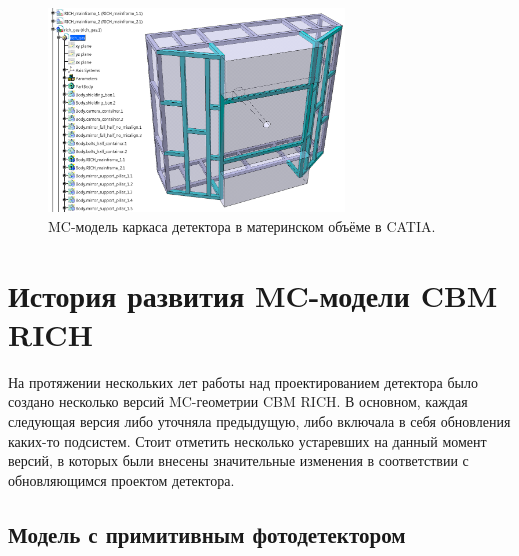 \begin{figure}[H]
\centering
\includegraphics[width=0.7\textwidth]{pictures/Mainframe.png}
\caption{MC-модель каркаса детектора в материнском объёме в CATIA.}
\label{fig:geoMainframe}
\end{figure}

%                                                                          

\section{История развития MC-модели CBM RICH}\label{sec:secRICHgeoHistory}

На протяжении нескольких лет работы над проектированием детектора было создано несколько версий MC-геометрии CBM RICH. В основном, каждая следующая версия либо уточняла предыдущую, либо включала в себя обновления каких-то подсистем. Стоит отметить несколько устаревших на данный момент версий, в которых были внесены значительные изменения в соответствии с обновляющимся проектом детектора.

\subsection{Модель с примитивным фотодетектором}\label{sec:secPrimitiveCamera}

